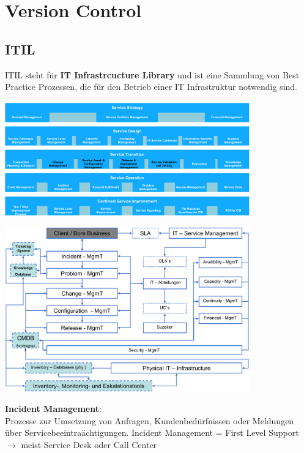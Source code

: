 \documentclass{report}
\newenvironment{Figure}
	{\par\medskip\noindent\minipage{\linewidth}}
	{\endminipage\par\medskip}
\theoremstyle{definition}
\theoremstyle{example}
\begin{document}
\chapter{Version Control}

\section{ITIL}
ITIL steht für \textbf{IT Infrastrcucture Library} und ist eine Sammlung von Best Practice Prozessen, die für den Betrieb einer IT Infrastruktur notwendig sind.

\begin{Figure}
\centering
\includegraphics[width=400px]{img/itilLifecycle.png}
	\label{fig:ITIL Lifecycle}
\end{Figure}

\begin{Figure}
\centering
\includegraphics[width=400px]{img/itilProzesse.png}
	\label{fig:ITIL Prozesse}
\end{Figure}

\textbf{Incident Management}:\\
Prozesse zur Umsetzung von Anfragen, Kundenbedürfnissen oder Meldungen über Servicebeeintraächtigungen. Incident Management = First Level Support $\rightarrow$ meist Service Desk oder Call Center\\
\end{document}
